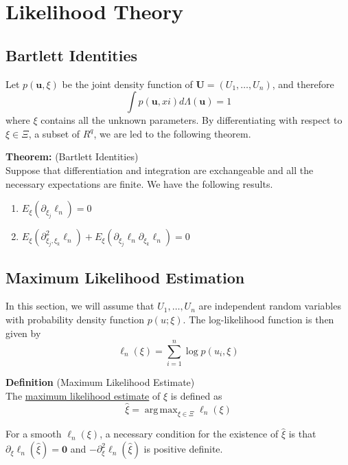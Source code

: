 \documentclass[12pt]{article}
\DeclareMathOperator*{\argmax}{arg\,max}
\numberwithin{equation}{section}
\begin{document}
\section{Likelihood Theory}
\subsection{Bartlett Identities}
Let $p(\mathbf{u}, \xi)$ be the joint density function of $\mathbf{U} = (U_1, \ldots, U_n)$, and therefore
\begin{equation*}
  \int p(\mathbf{u}, xi) d \Lambda(\mathbf{u}) = 1
\end{equation*}
where $\xi$ contains all the unknown parameters. By differentiating with respect to $\xi \in \Xi$, a subset of $R^q$, we are led to the following theorem.

\textbf{Theorem:} (Bartlett Identities) \\
Suppose that differentiation and integration are exchangeable and all the necessary expectations are finite. We have the following results.

\begin{enumerate}
  \item $E_{\xi}(\partial_{\xi_j} \ell_n) = 0$
  \item $E_{\xi}(\partial^2_{\xi_j, \xi_k} \ell_n)
  + 
  E_{\xi}(\partial_{\xi_j} \ell_n \partial_{\xi_k} \ell_n) = 0$
\end{enumerate}

\subsection{Maximum Likelihood Estimation}
In this section, we will assume that $U_1, \ldots, U_n$ are independent random variables with probability density function $p(u;\xi)$. The log-likelihood function is then given by
\begin{equation*}
  \ell_n(\xi) = \sum_{i=1}^n \log p(u_i, \xi)
\end{equation*}

\textbf{Definition} (Maximum Likelihood Estimate) \\
The \underline{maximum likelihood estimate} of $\xi$ is defined as
\begin{equation*}
  \hat{\xi} = \argmax_{\xi \in \Xi} \ell_n (\xi)
\end{equation*}

For a smooth $\ell_n(\xi)$, a necessary condition for the existence of $\hat{\xi}$ is that $\partial_{\xi} \ell_n(\hat{\xi}) = \mathbf{0}$ and $-\partial_{\xi}^2 \ell_n(\hat{\xi})$ is positive definite.
\end{document}
